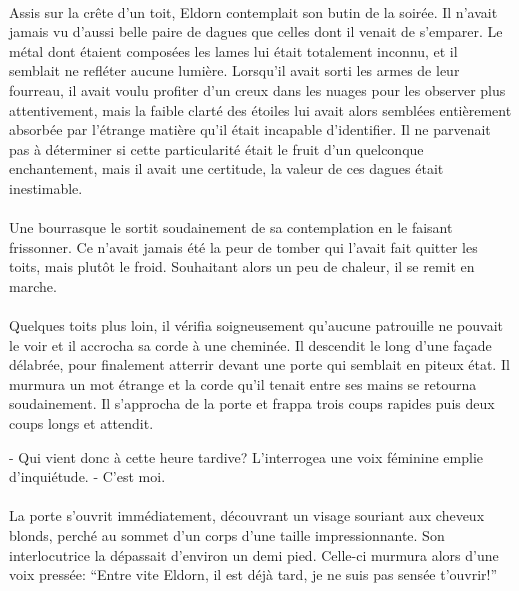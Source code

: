 \paragraph{}
Assis sur la crête d'un toit, Eldorn contemplait son butin de la soirée. Il
n'avait jamais vu d'aussi belle paire de dagues que celles dont il venait de
s'emparer. Le métal dont étaient composées les lames lui était totalement
inconnu, et il semblait ne refléter aucune lumière. Lorsqu'il avait sorti les
armes de leur fourreau, il avait voulu profiter d'un creux dans les nuages
pour les observer plus attentivement, mais la faible clarté des étoiles lui
avait alors semblées entièrement absorbée par l'étrange matière qu'il était
incapable d'identifier. Il ne parvenait pas à déterminer si cette
particularité était le fruit d'un quelconque enchantement, mais il avait une
certitude, la valeur de ces dagues était inestimable.

\paragraph{}
Une bourrasque le sortit soudainement de sa contemplation en le faisant
frissonner. Ce n'avait jamais été la peur de tomber qui l'avait fait quitter
les toits, mais plutôt le froid. Souhaitant alors un peu de chaleur, il
se remit en marche.

\paragraph{}%
Quelques toits plus loin, il vérifia soigneusement qu'aucune patrouille ne
pouvait le voir et il accrocha sa corde à une cheminée. Il descendit le
long d'une façade délabrée, pour finalement atterrir devant une porte qui
semblait en piteux état. Il murmura un mot étrange et la corde qu'il tenait
entre ses mains se retourna soudainement. Il s'approcha de la porte et frappa
trois coups rapides puis deux coups longs et attendit.

\indent- Qui vient donc à cette heure tardive? L'interrogea une voix féminine
 emplie d'inquiétude.\newline
\indent- C'est moi.

\paragraph{}
La porte s'ouvrit immédiatement, découvrant un visage souriant aux cheveux
blonds, perché au sommet d'un corps d'une taille impressionnante. Son
interlocutrice la dépassait d'environ un demi pied. Celle-ci murmura alors
d'une voix pressée: ``Entre vite Eldorn, il est déjà tard, je ne suis pas
sensée t'ouvrir!''

